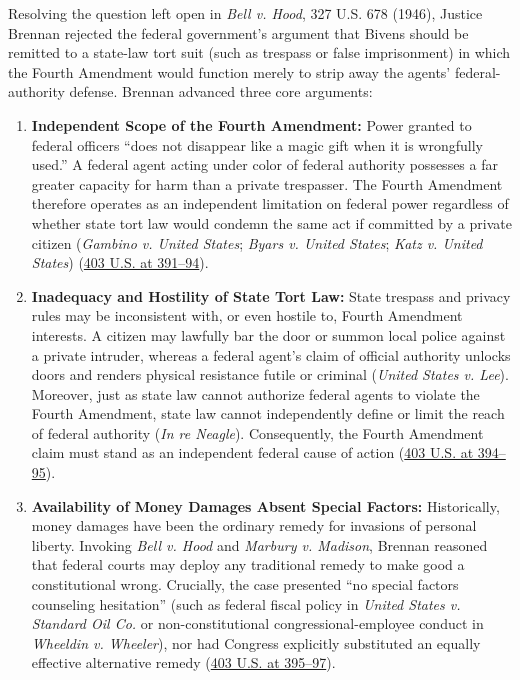 \documentclass[12pt]{article}
\begin{document}
Resolving the question left open in \textit{Bell v. Hood}, 327 U.S. 678 (1946), Justice Brennan rejected the federal government's argument that Bivens should be remitted to a state-law tort suit (such as trespass or false imprisonment) in which the Fourth Amendment would function merely to strip away the agents' federal-authority defense. Brennan advanced three core arguments:

\begin{enumerate}
  \item \textbf{Independent Scope of the Fourth Amendment:} Power granted to federal officers ``does not disappear like a magic gift when it is wrongfully used.'' A federal agent acting under color of federal authority possesses a far greater capacity for harm than a private trespasser. The Fourth Amendment therefore operates as an independent limitation on federal power regardless of whether state tort law would condemn the same act if committed by a private citizen (\textit{Gambino v. United States}; \textit{Byars v. United States}; \textit{Katz v. United States}) (\href{https://supreme.justia.com/cases/federal/us/403/388/}{403 U.S. at 391--94}).

  \item \textbf{Inadequacy and Hostility of State Tort Law:} State trespass and privacy rules may be inconsistent with, or even hostile to, Fourth Amendment interests. A citizen may lawfully bar the door or summon local police against a private intruder, whereas a federal agent's claim of official authority unlocks doors and renders physical resistance futile or criminal (\textit{United States v. Lee}). Moreover, just as state law cannot authorize federal agents to violate the Fourth Amendment, state law cannot independently define or limit the reach of federal authority (\textit{In re Neagle}). Consequently, the Fourth Amendment claim must stand as an independent federal cause of action (\href{https://www.law.cornell.edu/supremecourt/text/403/388}{403 U.S. at 394--95}).

  \item \textbf{Availability of Money Damages Absent Special Factors:} Historically, money damages have been the ordinary remedy for invasions of personal liberty. Invoking \textit{Bell v. Hood} and \textit{Marbury v. Madison}, Brennan reasoned that federal courts may deploy any traditional remedy to make good a constitutional wrong. Crucially, the case presented ``no special factors counseling hesitation'' (such as federal fiscal policy in \textit{United States v. Standard Oil Co.} or non-constitutional congressional-employee conduct in \textit{Wheeldin v. Wheeler}), nor had Congress explicitly substituted an equally effective alternative remedy (\href{https://supreme.justia.com/cases/federal/us/403/388/}{403 U.S. at 395--97}).
\end{enumerate}
\end{document}
